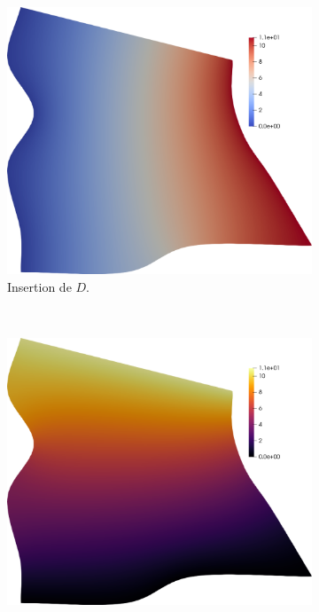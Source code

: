 \begin{figure}[h!]
\centering
\begin{subfigure}{0.48\textwidth}
    \includegraphics[width=\textwidth]{images/quad_equation_1.pdf}
    \caption{Insertion de $D$.}
    \label{fig:quad_equation_1}
\end{subfigure}
\\[0.5cm]
\begin{subfigure}{0.48\textwidth}
    \includegraphics[width=\textwidth]{images/quad_equation_2.pdf}

\end{subfigure}
\end{figure}
